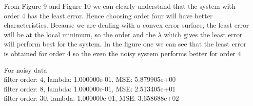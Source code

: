 \documentclass[10pt, letterpaper]{article}
\begin{document}
\begin{enumerate}
From Figure 9 and Figure 10 we can clearly understand that the system with order 4 has the least error. Hence choosing order four will have better characteristics. Because we are dealing with a convex error surface, the least error will be at the local minimum, so the order and the $\lambda$ which gives the least error will perform best for the system. In the figure one we can see that the least error is obtained for order 4 so the even the noisy system performs better for order 4

For noisy data\\
filter order: 4, lambda: 1.000000e-01, MSE: 5.879905e+00\\
filter order: 8, lambda: 1.000000e-01, MSE: 2.513405e+01\\
filter order: 30, lambda: 1.000000e-01, MSE: 3.658688e+02\\

\end{enumerate}
\end{document}
